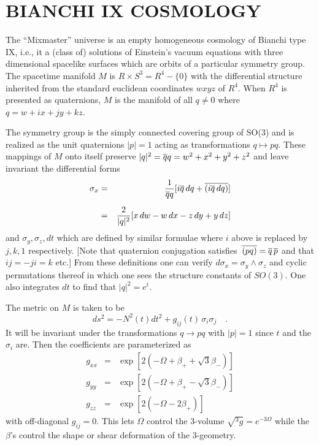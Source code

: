 \section{BIANCHI {\sf IX} COSMOLOGY}

\indent
The ``Mixmaster'' universe is an empty homogeneous cosmology of
Bianchi type IX, i.e., it a (class of) solutions of Einstein's vacuum
equations with three dimensional spacelike surfaces which are orbits
of a particular symmetry group. The spacetime manifold $M$ is $R
\times S^3 = R^4 - \{ 0 \}$ with the differential structure inherited
from the standard euclidean coordinates $wxyz$ of $R^4$. When $R^4$
is presented as quaternions, $M$ is the manifold of all $q \neq 0$
where $q = w + ix + jy + kz$.

The symmetry group is the simply connected covering group of SO(3)
and is realized as the unit quaternions $|p| = 1$ acting as
transformations $q \mapsto pq$.  These mappings of $M$ onto
itself preserve $|q|^2 = \overline{q}q = w^2 + x^2 + y^2 + z^2$ and leave
invariant the differential forms
\begin{eqnarray}
\sigma_x & = & \frac{1}{\overline{q}q}[i\overline{q}\,dq + \overline{(i\overline{q}\,dq)}]
                \\[\medskipamount]
	 & = & \frac{2}{|q|^2}[x\,dw - w\,dx - z\,dy + y\,dz]
           \nonumber
\end{eqnarray}
and $\sigma_y, \sigma_z, dt$ which are defined by similar formulae
where $i$ above is replaced by $j, k, 1$ respectively.  [Note that
quaternion conjugation satisfies\ $\overline{(pq)} = \overline{q}\,\overline{p}$ and that
$ij = -ji = k$ etc.]
{}From these definitions one can verify $d\sigma_x = \sigma_y \wedge
\sigma_z$ and cyclic permutations thereof in which one sees the
structure constants of $SO(3)$.  One also integrates $dt$ to find
that $|q|^2 = e^t$.

The metric on $M$ is taken to be
\begin{equation}
ds^2 = - N^2(t)dt^2 + g_{ij}(t)\,\sigma_i \sigma_j \quad .
\end{equation}
It will be invariant under the transformations $q \rightarrow pq$
with $|p| = 1$ since $t$ and the $\sigma_i$ are. Then the
coefficients are parameterized as
\begin{eqnarray}
g_{xx} & = & \exp[2(-\Omega + \beta_+ + \sqrt{3}\beta_-)] \nonumber\\
g_{yy} & = & \exp[2(-\Omega + \beta_+ - \sqrt{3}\beta_-)]
                            \label{e-gij}\\
g_{zz} & = & \exp[2(-\Omega - 2\beta_+)]                  \nonumber
\end{eqnarray}
with off-diagonal $g_{ij} = 0$.  This lets $\Omega$ control the
3-volume $\sqrt{{}^3g} = e^{-3\Omega}$ while the $\beta$'s control the
shape or shear deformation of the 3-geometry.

